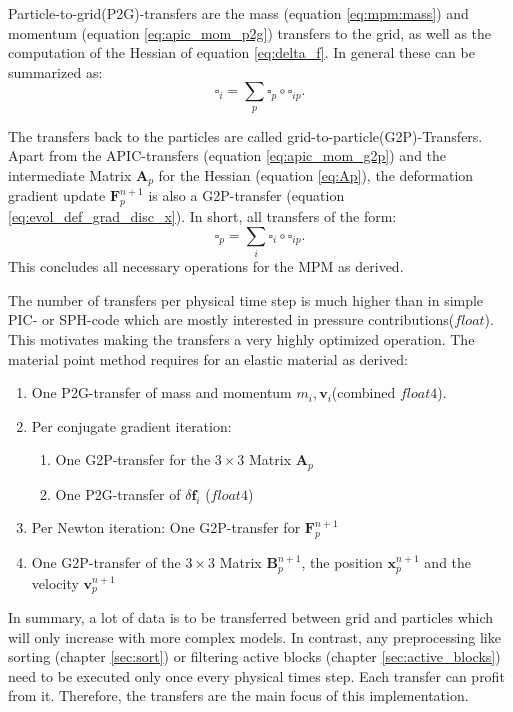 \documentclass[m,times]{cgMA}
\begin{document}
Particle-to-grid(P2G)-transfers are the mass (equation \ref{eq:mpm:mass}) and momentum (equation \ref{eq:apic_mom_p2g}) transfers to the grid, as well as the computation of the Hessian of equation \ref{eq:delta_f}. In general these can be summarized as:
$$\square_i = \sum_p \square_p \circ \square_{ip}.$$

The transfers back to the particles are called grid-to-particle(G2P)-Transfers. Apart from the APIC-transfers (equation \ref{eq:apic_mom_g2p}) and the intermediate Matrix $\boldsymbol{A}_p$ for the Hessian (equation \ref{eq:Ap}), the deformation gradient update $\boldsymbol{F}^{n+1}_p$ is also a G2P-transfer (equation \ref{eq:evol_def_grad_disc_x}). In short, all transfers of the form:
$$\square_p = \sum_i \square_i \circ \square_{ip}.$$
This concludes all necessary operations for the MPM as derived.

The number of transfers per physical time step is much higher than in simple PIC- or SPH-code which are mostly interested in pressure contributions($float$). This motivates making the transfers a very highly optimized operation. The material point method requires for an elastic material as derived:
\begin{enumerate}
  \item One P2G-transfer of mass and momentum $m_i, \boldsymbol{v}_i$(combined $float4$).
  \item Per conjugate gradient iteration:
    \begin{enumerate}
      \item One G2P-transfer for the $3 \times 3$ Matrix $\boldsymbol{A}_p$
      \item One P2G-transfer of $\delta \boldsymbol{f}_i$ ($float4$)
    \end{enumerate}
  \item Per Newton iteration: One G2P-transfer for $\boldsymbol{F}^{n+1}_p$
  \item One G2P-transfer of the $3 \times 3$ Matrix $\boldsymbol{B}_p^{n+1}$, the position $\boldsymbol{x}_p^{n+1}$ and the velocity $\boldsymbol{v}_p^{n+1}$
\end{enumerate}
In summary, a lot of data is to be transferred between grid and particles which will only increase with more complex models. In contrast, any preprocessing like sorting (chapter \ref{sec:sort}) or filtering active blocks (chapter \ref{sec:active_blocks}) need to be executed only once every physical times step. Each transfer can profit from it. Therefore, the transfers are the main focus of this implementation.
\end{document}
